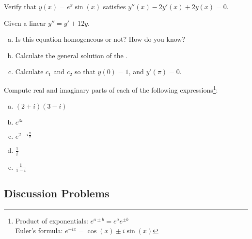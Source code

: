 \begin{question}
  Verify that \(y(x) = e^{x}\sin(x)\) satisfies \(y''(x) - 2 y'(x) + 2 y(x) = 0\).
\end{question}
\solspace{3.5in}

\begin{question}
Given a linear \ode{} $y''= y' + 12y$. 
\begin{enumerate}[(a)]
\item Is this equation homogeneous or not? How do you know?  \solspace{.25in}
\item Calculate the general solution of the \ode{}. \solspace{2in}
\item Calculate $c_1$ and $c_2$ so that $y(0) = 1$, and $y'(\pi) = 0$.\solspace{1.5in}
\end{enumerate}
\end{question}

\begin{question}
  Compute real and imaginary parts of each of the following expressions\footnote{
    Product of exponentials:
    \(e^{a\pm b} = e^{a} e^{\pm b}\)\\
    Euler's formula: \(e^{\pm i x} = \cos(x) \pm i \sin (x) \)
    }:
  \begin{enumerate}[(a)]
  \item \( \displaystyle (2+i)(3-i)\) \solspace{.5in}
    \item \( \displaystyle e^{3i}\) \solspace{.5in}
    \item \( \displaystyle e^{2-i\frac{\pi}{2}}\) \solspace{.5in} 

    \item \( \displaystyle \frac{1}{i}\) \solspace{.5in}
    \item \( \displaystyle \frac{1}{1-i}\) \solspace{.5in}
  \end{enumerate}
\end{question}


\subsection*{Discussion Problems}

